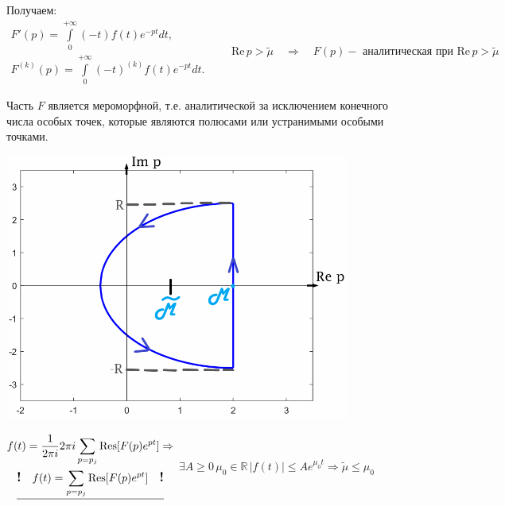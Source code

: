 \documentclass[oneside, final, 12pt]{article}
\theoremstyle{def}
\begin{document}
	Получаем:
	$$
		\begin{gathered}
			F'(p) = \int\limits_{0}^{+\infty} (-t)f(t) e^{-pt}dt, \\
			F^{(k)}(p)=  \int\limits_{0}^{+\infty} (-t)^{(k)}f(t) e^{-pt}dt. 
		\end{gathered}\qquad \textrm{Re}\, p > \widetilde\mu \quad \Rightarrow \quad
					 F(p) - \text{ аналитическая при }\textrm{Re}\, p > \widetilde\mu
	$$
		
		Часть $F$ является мероморфной, т.е. аналитической за исключением конечного числа особых точек,
		которые являются полюсами или устранимыми особыми точками. \newline
	
	\begin{minipage}{0.5\textwidth}	
	
		 \newline
		\includegraphics[width=0.85\textwidth]{pict/analit_pict.png}
	\end{minipage}
	\hfill
	\begin{minipage}{0.4\textwidth}
		$
		\begin{gathered}
	 		f(t) =\dfrac{1}{2\pi i} 2\pi i \sum\limits_{p=p_j}\textrm{Res} [F(p)e^{pt}] \Rightarrow \\
	 		\underline{\textbf{\large!} \quad f(t) = \sum\limits_{p=p_j}\textrm{Res} [F(p)e^{pt}] \quad \textbf{\large!}}
		\end{gathered} \vspace{10mm}
		$
		\newline
		$\exists A \geqslant 0 \, \mu_0 \in \mathbb{R} \, |f(t)|\leqslant Ae^{\mu_0 t}\Rightarrow 
			\widetilde\mu \leqslant \mu_0$
	\end{minipage} \newline
	
\end{document}
